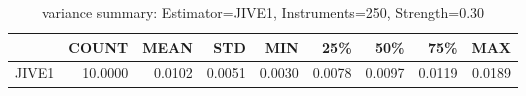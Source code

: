 \begin{table}[ht]
\centering
\caption{variance summary: Estimator=JIVE1, Instruments=250, Strength=0.30}
\begin{tabular}{lrrrrrrrr}
\toprule
 & COUNT & MEAN & STD & MIN & 25\% & 50\% & 75\% & MAX \\
\midrule
JIVE1 & 10.0000 & 0.0102 & 0.0051 & 0.0030 & 0.0078 & 0.0097 & 0.0119 & 0.0189 \\
\bottomrule
\end{tabular}
\end{table}
